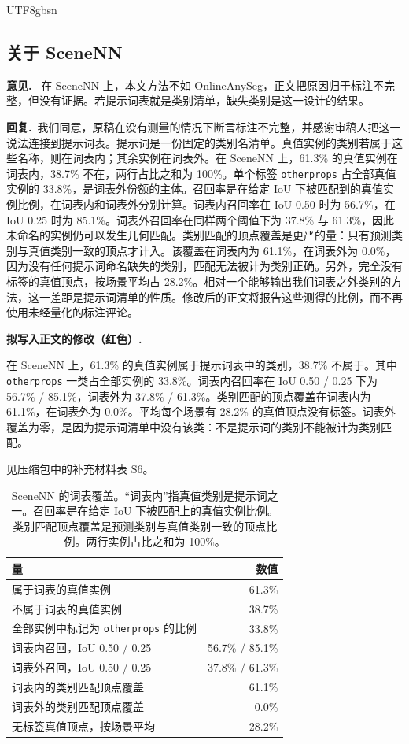\documentclass[11pt]{article}
\newcommand{\revcomment}[1]{%
  \par\vspace{0.6em}\noindent\textcolor{revblue}{\textbf{意见.}}\ %
  \textcolor{revblue}{#1}\par\vspace{0.4em}}
\newcommand{\revresponse}[1]{%
  \par\noindent\textbf{回复.}\ #1\par\vspace{0.3em}}
\newcommand{\revchange}[1]{%
  \par\noindent\textbf{拟写入正文的修改（红色）.}\par
  \noindent\textcolor{revred}{#1}\par\vspace{0.8em}}
\begin{document}
\begin{CJK*}{UTF8}{gbsn}
\subsection*{关于 SceneNN}

\revcomment{在 SceneNN 上，本文方法不如 OnlineAnySeg，正文把原因归于标注不完整，但没有证据。若提示词表就是类别清单，缺失类别是这一设计的结果。}

\revresponse{我们同意，原稿在没有测量的情况下断言标注不完整，并感谢审稿人把这一说法连接到提示词表。提示词是一份固定的类别名清单。真值实例的类别若属于这些名称，则在词表内；其余实例在词表外。在 SceneNN 上，61.3\% 的真值实例在词表内，38.7\% 不在，两行占比之和为 100\%。单个标签 \texttt{otherprops} 占全部真值实例的 33.8\%，是词表外份额的主体。召回率是在给定 IoU 下被匹配到的真值实例比例，在词表内和词表外分别计算。词表内召回率在 IoU 0.50 时为 56.7\%，在 IoU 0.25 时为 85.1\%。词表外召回率在同样两个阈值下为 37.8\% 与 61.3\%，因此未命名的实例仍可以发生几何匹配。类别匹配的顶点覆盖是更严的量：只有预测类别与真值类别一致的顶点才计入。该覆盖在词表内为 61.1\%，在词表外为 0.0\%，因为没有任何提示词命名缺失的类别，匹配无法被计为类别正确。另外，完全没有标签的真值顶点，按场景平均占 28.2\%。相对一个能够输出我们词表之外类别的方法，这一差距是提示词清单的性质。修改后的正文将报告这些测得的比例，而不再使用未经量化的标注评论。}

\revchange{在 SceneNN 上，61.3\% 的真值实例属于提示词表中的类别，38.7\% 不属于。其中 \texttt{otherprops} 一类占全部实例的 33.8\%。词表内召回率在 IoU 0.50 / 0.25 下为 56.7\% / 85.1\%，词表外为 37.8\% / 61.3\%。类别匹配的顶点覆盖在词表内为 61.1\%，在词表外为 0.0\%。平均每个场景有 28.2\% 的真值顶点没有标签。词表外覆盖为零，是因为提示词清单中没有该类：不是提示词的类别不能被计为类别匹配。}

\noindent 见压缩包中的补充材料表 S6。

\begin{table}[ht]
\centering
\caption{SceneNN 的词表覆盖。“词表内”指真值类别是提示词之一。召回率是在给定 IoU 下被匹配上的真值实例比例。类别匹配顶点覆盖是预测类别与真值类别一致的顶点比例。两行实例占比之和为 100\%。}
\label{tab:scenenn}
\small
\begin{tabular}{lr}
\toprule
量 & 数值 \\
\midrule
属于词表的真值实例 & 61.3\% \\
不属于词表的真值实例 & 38.7\% \\
全部实例中标记为 \texttt{otherprops} 的比例 & 33.8\% \\
词表内召回，IoU 0.50 / 0.25 & 56.7\% / 85.1\% \\
词表外召回，IoU 0.50 / 0.25 & 37.8\% / 61.3\% \\
词表内的类别匹配顶点覆盖 & 61.1\% \\
词表外的类别匹配顶点覆盖 & 0.0\% \\
无标签真值顶点，按场景平均 & 28.2\% \\
\bottomrule
\end{tabular}
\end{table}


\end{CJK*}
\end{document}
